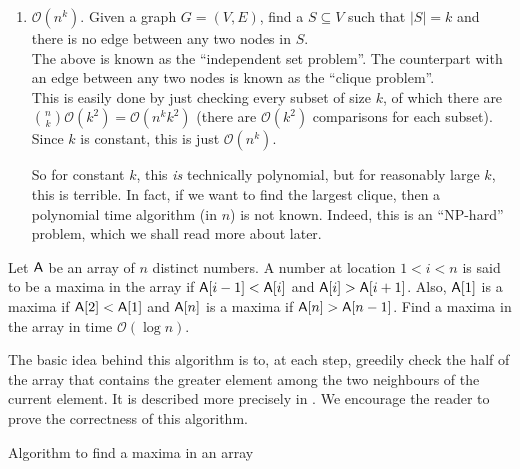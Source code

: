 \begin{enumerate}
	\item $\mathcal{O}(n^k)$. Given a graph $G=(V,E)$, find a $S\subseteq V$ such that $|S|=k$ and there is no edge between any two nodes in $S$.\\
	The above is known as the ``independent set problem''. The counterpart with an edge between any two nodes is known as the ``clique problem''.\\
	This is easily done by just checking every subset of size $k$, of which there are $\binom{n}{k}\mathcal{O}(k^2)=\mathcal{O}(n^k k^2)$ (there are $\mathcal{O}(k^2)$ comparisons for each subset). Since $k$ is constant, this is just $\mathcal{O}(n^k)$.

	So for constant $k$, this \textit{is} technically polynomial, but for reasonably large $k$, this is terrible. In fact, if we want to find the largest clique, then a polynomial time algorithm (in $n$) is not known. Indeed, this is an ``NP-hard'' problem, which we shall read more about later.

\end{enumerate}

\begin{exercise}
Let $\mathsf{A}$ be an array of $n$ distinct numbers. A number at location $1<i<n$ is said to be a maxima in the array if $\mathsf{A}[i-1]<\mathsf{A}[i]$ and $\mathsf{A}[i]>\mathsf{A}[i+1]$. Also, $\mathsf{A}[1]$ is a maxima if $\mathsf{A}[2]<\mathsf{A}[1]$ and $\mathsf{A}[n]$ is a maxima if $\mathsf{A}[n]>\mathsf{A}[n-1]$. Find a maxima in the array in time $\mathcal{O}(\log n)$.
\end{exercise}
\begin{solution}
	The basic idea behind this algorithm is to, at each step, greedily check the half of the array that contains the greater element among the two neighbours of the current element. It is described more precisely in . We encourage the reader to prove the correctness of this algorithm.
\end{solution}
	\begin{algorithm}
		\DontPrintSemicolon
		\caption{Algorithm to find a maxima in an array}\label{algo: find maxima}
	\end{algorithm}

